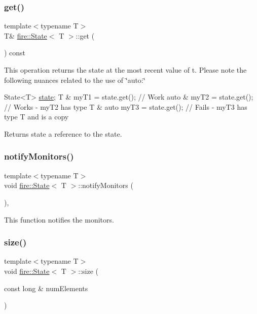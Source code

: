 \subsubsection{\texorpdfstring{get()}{get()}}
{\footnotesize\ttfamily template$<$typename T$>$ \\
T\& \hyperlink{a00818}{fire\+::\+State}$<$ T $>$\+::get (\begin{DoxyParamCaption}{ }\end{DoxyParamCaption}) const\hspace{0.3cm}{\ttfamily [inline]}}

This operation returns the state at the most recent value of t. Please note the following nuances related to the use of \char`\"{}auto\+:\char`\"{} 
\begin{DoxyCode}
State<T> \hyperlink{a00818_a9a75139f1d613abc9fb82600757087f6}{state};
T & myT1 = state.get(); \textcolor{comment}{// Work}
\textcolor{keyword}{auto} & myT2 = state.get(); \textcolor{comment}{// Works - myT2 has type T &}
\textcolor{keyword}{auto} myT3 = state.get(); \textcolor{comment}{// Fails - myT3 has type T and is a copy}
\end{DoxyCode}
 \begin{DoxyReturn}{Returns}
state a reference to the state. 
\end{DoxyReturn}
\mbox{\label{a00818_ad271749a2a4f73c11e82ae28141d3b65}} 
\subsubsection{\texorpdfstring{notify\+Monitors()}{notifyMonitors()}}
{\footnotesize\ttfamily template$<$typename T$>$ \\
void \hyperlink{a00818}{fire\+::\+State}$<$ T $>$\+::notify\+Monitors (\begin{DoxyParamCaption}{ }\end{DoxyParamCaption})\hspace{0.3cm}{\ttfamily [inline]}, {\ttfamily [protected]}}

This function notifies the monitors. \mbox{\label{a00818_a22b2d9e2feb153c819e90a4ac7ee8d72}} 
\subsubsection{\texorpdfstring{size()}{size()}\hspace{0.1cm}{\footnotesize\ttfamily [1/2]}}
{\footnotesize\ttfamily template$<$typename T$>$ \\
void \hyperlink{a00818}{fire\+::\+State}$<$ T $>$\+::size (\begin{DoxyParamCaption}\item[{const long \&}]{num\+Elements }\end{DoxyParamCaption})\hspace{0.3cm}{\ttfamily [inline]}}

